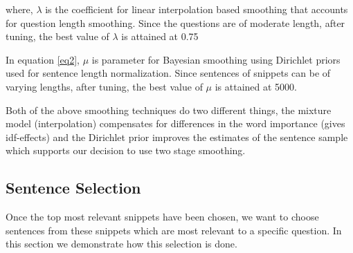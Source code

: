 where, $\lambda$ is the coefficient for linear interpolation based smoothing that accounts for question length smoothing. Since the questions are of moderate length, after tuning, the best value of $\lambda$ is attained at 0.75

In equation \ref{eq2}, $\mu$ is parameter for Bayesian smoothing using Dirichlet priors used for sentence length normalization. Since sentences of snippets can be of varying lengths, after tuning, the best value of $\mu$ is attained at 5000.

Both of the above smoothing techniques do two different things, the mixture model (interpolation) compensates for differences in the word importance (gives idf-effects) and the Dirichlet prior improves the estimates of the sentence sample which supports our decision to use two stage smoothing. 




\subsection{Sentence Selection}
Once the top most relevant snippets have been chosen, we want to choose sentences from these snippets which are most relevant to a specific question. In this section we demonstrate how this selection is done.


